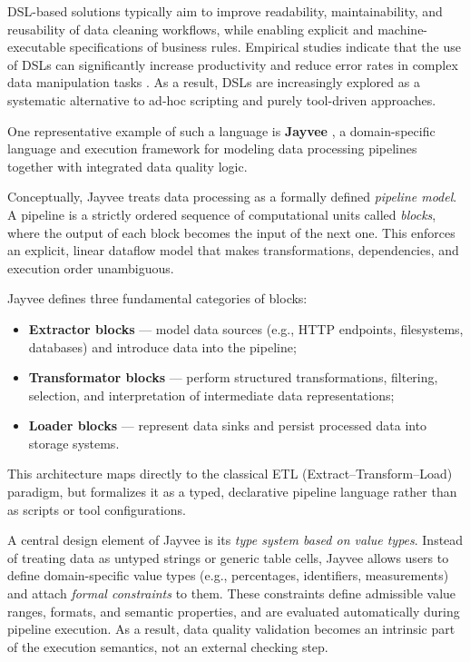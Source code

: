 DSL-based solutions typically aim to improve readability, maintainability, and reusability of data cleaning workflows, while enabling explicit and machine-executable specifications of business rules. 
Empirical studies indicate that the use of DSLs can significantly increase productivity and reduce error rates in complex data manipulation tasks \cite{dsl-empirical-2025}. 
As a result, DSLs are increasingly explored as a systematic alternative to ad-hoc scripting and purely tool-driven approaches.

One representative example of such a language is \textbf{Jayvee} \cite{jayvee}, a domain-specific language and execution framework for modeling data processing pipelines together with integrated data quality logic.

Conceptually, Jayvee treats data processing as a formally defined \emph{pipeline model}. 
A pipeline is a strictly ordered sequence of computational units called \emph{blocks}, where the output of each block becomes the input of the next one. 
This enforces an explicit, linear dataflow model that makes transformations, dependencies, and execution order unambiguous.

Jayvee defines three fundamental categories of blocks:
\begin{itemize}[label=-, noitemsep]
    \item \textbf{Extractor blocks} — model data sources (e.g., HTTP endpoints, filesystems, databases) and introduce data into the pipeline;
    \item \textbf{Transformator blocks} — perform structured transformations, filtering, selection, and interpretation of intermediate data representations;
    \item \textbf{Loader blocks} — represent data sinks and persist processed data into storage systems.
\end{itemize}

This architecture maps directly to the classical ETL (Extract--Transform--Load) paradigm, but formalizes it as a typed, declarative pipeline language rather than as scripts or tool configurations.

A central design element of Jayvee is its \emph{type system based on value types}. 
Instead of treating data as untyped strings or generic table cells, Jayvee allows users to define domain-specific value types (e.g., percentages, identifiers, measurements) and attach \emph{formal constraints} to them. 
These constraints define admissible value ranges, formats, and semantic properties, and are evaluated automatically during pipeline execution. 
As a result, data quality validation becomes an intrinsic part of the execution semantics, not an external checking step.

